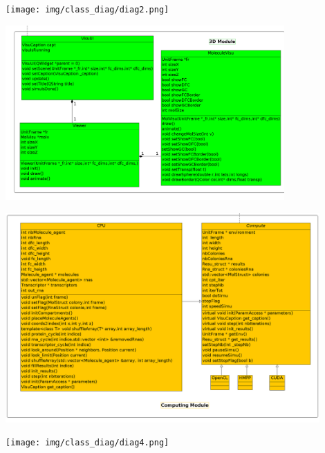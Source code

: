 \begin{center}
  \texttt{[image: img/class\_diag/diag2.png]}
\end{center}
\newpage

\begin{center}
  \includegraphics[angle=90,width=0.8\textwidth]{img/class_diag/diag3.png}
\end{center}
\newpage

\begin{center}
  \includegraphics[angle=90,width=0.9\textwidth]{img/class_diag/diag5.png}
\end{center}
\newpage

\begin{center}
  \texttt{[image: img/class\_diag/diag4.png]}
\end{center}



